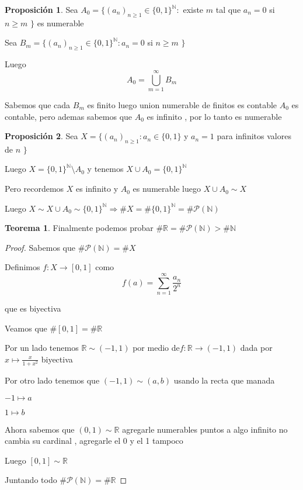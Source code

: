 \documentclass[12pt]{article}
\newcommand{\R}{\mathbb{R}}
\newcommand{\N}{\mathbb{N}}
\newcommand{\Ra}{\Rightarrow}
\newcommand{\ra}{\rightarrow}
\theoremstyle{definition}
\newtheorem{theorem}{Teorema}
\newtheorem{prop}{Proposición}
\begin{document}
\begin{prop}
  Sea $A_{0} = \{(a_{n})_{n \geq 1} \in \{0,1\}^{\N} :$ existe $m$ tal que $a_{n} = 0$ si $ n \geq m$ $\}$ es numerable

  Sea $B_{m} = \{(a_{n})_{n \geq 1} \in \{0,1\}^{\N} : a_{n} = 0 $ si $ n \geq m$ $\}$

Luego $$A_{0} = \bigcup_{m = 1}^{\infty} B_{m}$$ 

Sabemos que cada $B_{m}$ es finito luego union numerable de finitos es contable $A_{0}$ es contable, pero ademas sabemos que $A_{0}$ es infinito , por lo tanto es numerable

\end{prop}

\begin{prop}
 Sea $X = \{(a_{n})_{n \geq 1} : a_{n} \in \{0,1\}$ y $ a_{n} = 1 $ para infinitos valores de $ n$ $\}$

 Luego $X = \{0,1\}^{\N} \setminus A_{0}$ y tenemos $X \cup A_{0} = \{0,1\}^{\N}$ 

 Pero recordemos $X$ es infinito y $A_{0}$ es numerable luego $X \cup A_{0} \sim X$

 Luego $X \sim X \cup A_{0} \sim \{0,1\}^{\N} \Ra \# X = \# \{0,1\}^{\N} = \# \mathcal{P}(\N)$
\end{prop}

\begin{theorem}
  Finalmente podemos probar $\# \R = \# \mathcal{P}(\N) > \# \N$

  \begin{proof}
    Sabemos que $\# \mathcal{P}(\N) = \# X $

    Definimos $f: X \ra [0,1]$ como $$f(a) = \sum_{n = 1}^{\infty} \frac{a_{n}}{2^n}$$

que es biyectiva

Veamos que $\# [0,1] = \# \R$ 

Por un lado tenemos $\R \sim (-1,1)$ por medio de$f:\R \ra (-1,1)$ dada por $x \mapsto \frac{x}{1 + x^2}$ biyectiva

Por otro lado tenemos que $(-1,1) \sim (a,b)$ usando la recta que manada 

$-1 \mapsto a$ 

$1 \mapsto b$

Ahora sabemos que $(0,1) \sim \R$ agregarle numerables puntos a algo infinito no cambia su cardinal , agregarle el 0 y el 1 tampoco 

Luego $[0,1] \sim \R$

Juntando todo $\# \mathcal{P}(\N) = \# \R$
  \end{proof}
\end{theorem}
\end{document}
